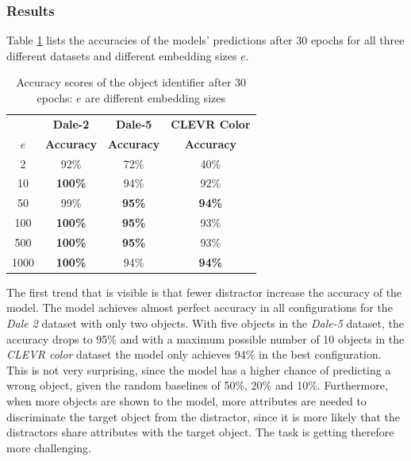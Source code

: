 \subsubsection*{Results}
Table \ref{tab:results:bounding_box_classifier} lists the accuracies of the models' predictions after 30 epochs for all three different datasets and different embedding sizes $e$.

\begin{table}[ht]
    \centering
    \begin{tabular}{c|c|c|c}
        \toprule
               & \textbf{Dale-2}   & \textbf{Dale-5}   & \textbf{CLEVR Color} \\\cmidrule(lr){2-2}\cmidrule(lr){3-3}\cmidrule(lr){4-4}
        $e$    & \textbf{Accuracy} & \textbf{Accuracy} & \textbf{Accuracy}    \\\midrule
        {2}    & {92\%}            & {72\%}            & {40\%}               \\
        {10}   & \textbf{100\%}    & {94\%}            & {92\%}               \\
        {50}   & {99\%}            & \textbf{95\%}     & \textbf{94\%}        \\
        {100}  & \textbf{100\%}    & \textbf{95\%}     & {93\%}               \\
        {500}  & \textbf{100\%}    & \textbf{95\%}     & {93\%}               \\
        {1000} & \textbf{100\%}    & {94\%}            & \textbf{94\%}        \\
        \bottomrule
    \end{tabular}
    \caption{Accuracy scores of the object identifier after 30 epochs: $e$ are different embedding sizes}
    \label{tab:results:bounding_box_classifier}
\end{table}

The first trend that is visible is that fewer distractor increase the accuracy of the model.
The model achieves almost perfect accuracy in all configurations for the \emph{Dale 2} dataset with only two objects.
With five objects in the \emph{Dale-5} dataset, the accuracy drops to 95\% and with a maximum possible number of 10 objects in the \emph{CLEVR color} dataset the model only achieves 94\% in the best configuration.
This is not very surprising, since the model has a higher chance of predicting a wrong object, given the random baselines of 50\%, 20\% and 10\%.
Furthermore, when more objects are shown to the model, more attributes are needed to discriminate the target object from the distractor, since it is more likely that the distractors share attributes with the target object.
The task is getting therefore more challenging.

